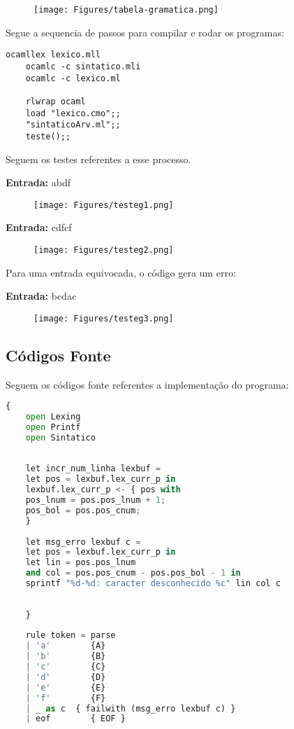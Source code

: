 \documentclass[hidelinks,12pt]{article}
\begin{document}
	\begin{figure}[h!]
		\centering
		\texttt{[image: Figures/tabela-gramatica.png]}
	\end{figure}
	
	Segue a sequencia de passos para compilar e rodar os programas:
	
	\begin{lstlisting}[caption=Analisador Léxico com Comentário]
	ocamllex lexico.mll
	ocamlc -c sintatico.mli
	ocamlc -c lexico.ml
	
	rlwrap ocaml
	load "lexico.cmo";;
	"sintaticoArv.ml";;
	teste();;
	\end{lstlisting}
	
	
	Seguem os testes referentes a esse processo.
	
	\textbf{Entrada:} abdf
	
	\begin{figure}[h!]
		\centering
		\texttt{[image: Figures/testeg1.png]}
	\end{figure}
	
	\textbf{Entrada:} cdfcf
	
	\begin{figure}[h!]
		\centering
		\texttt{[image: Figures/testeg2.png]}
	\end{figure}
	
	Para uma entrada equivocada, o código gera um erro:
	
	\textbf{Entrada:} bcdac
	\begin{figure}[h!]
		\centering
		\texttt{[image: Figures/testeg3.png]}
	\end{figure}
	
	\subsection{Códigos Fonte}
	
	Seguem os códigos fonte referentes a implementação do programa:
	
	\begin{lstlisting}[caption=léxico.mll, language=python]
	{
	open Lexing
	open Printf
	open Sintatico
	
	
	let incr_num_linha lexbuf = 
	let pos = lexbuf.lex_curr_p in
	lexbuf.lex_curr_p <- { pos with
	pos_lnum = pos.pos_lnum + 1;
	pos_bol = pos.pos_cnum;
	}
	
	let msg_erro lexbuf c =
	let pos = lexbuf.lex_curr_p in
	let lin = pos.pos_lnum
	and col = pos.pos_cnum - pos.pos_bol - 1 in
	sprintf "%d-%d: caracter desconhecido %c" lin col c
	
	
	}
	
	rule token = parse 
	| 'a'        {A}
	| 'b'        {B}
	| 'c'        {C}
	| 'd'        {D}
	| 'e'        {E}
	| 'f'        {F}
	| _ as c  { failwith (msg_erro lexbuf c) }
	| eof        { EOF }
	
	
	
	
	\end{lstlisting}
	
\end{document}
